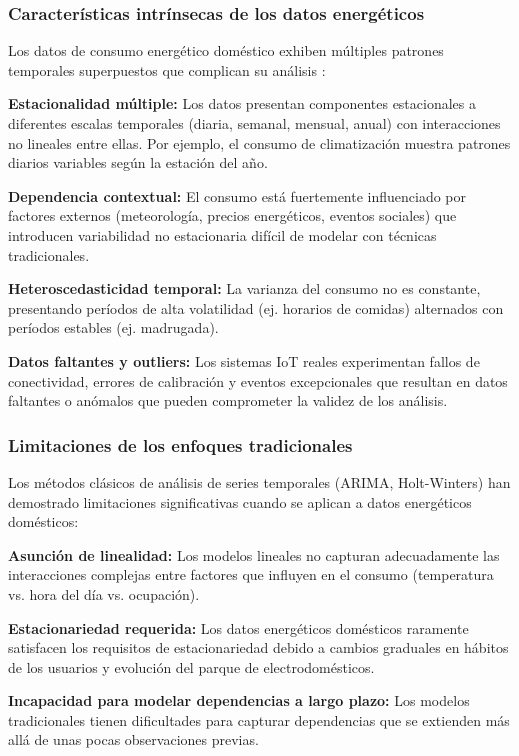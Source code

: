 \subsubsection{Características intrínsecas de los datos energéticos}

Los datos de consumo energético doméstico exhiben múltiples patrones temporales superpuestos que complican su análisis \cite{haben2016review}:

\textbf{Estacionalidad múltiple:} Los datos presentan componentes estacionales a diferentes escalas temporales (diaria, semanal, mensual, anual) con interacciones no lineales entre ellas. Por ejemplo, el consumo de climatización muestra patrones diarios variables según la estación del año.

\textbf{Dependencia contextual:} El consumo está fuertemente influenciado por factores externos (meteorología, precios energéticos, eventos sociales) que introducen variabilidad no estacionaria difícil de modelar con técnicas tradicionales.

\textbf{Heteroscedasticidad temporal:} La varianza del consumo no es constante, presentando períodos de alta volatilidad (ej. horarios de comidas) alternados con períodos estables (ej. madrugada).

\textbf{Datos faltantes y outliers:} Los sistemas IoT reales experimentan fallos de conectividad, errores de calibración y eventos excepcionales que resultan en datos faltantes o anómalos que pueden comprometer la validez de los análisis.

\subsubsection{Limitaciones de los enfoques tradicionales}

Los métodos clásicos de análisis de series temporales (ARIMA, Holt-Winters) han demostrado limitaciones significativas cuando se aplican a datos energéticos domésticos:

\textbf{Asunción de linealidad:} Los modelos lineales no capturan adecuadamente las interacciones complejas entre factores que influyen en el consumo (temperatura vs. hora del día vs. ocupación).

\textbf{Estacionariedad requerida:} Los datos energéticos domésticos raramente satisfacen los requisitos de estacionariedad debido a cambios graduales en hábitos de los usuarios y evolución del parque de electrodomésticos.

\textbf{Incapacidad para modelar dependencias a largo plazo:} Los modelos tradicionales tienen dificultades para capturar dependencias que se extienden más allá de unas pocas observaciones previas.

